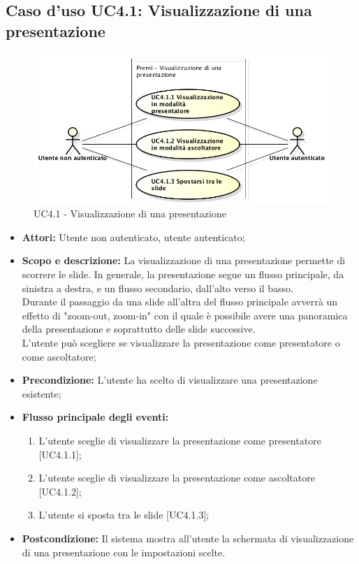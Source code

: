 \subsection{Caso d'uso UC4.1: Visualizzazione di una presentazione}
\begin{figure}[h] 
	\centering 
	\includegraphics[scale=0.45] {img/UC4.1.png}
	\caption{UC4.1 - Visualizzazione di una presentazione} 
\end{figure}

\begin{itemize}
	\item \textbf{Attori:} Utente non autenticato, utente autenticato;
	\item \textbf{Scopo e descrizione:} La visualizzazione di una presentazione permette di scorrere le slide. In generale, la presentazione segue un flusso principale, da sinistra a destra, e un flusso secondario, dall'alto verso il basso.\\
	Durante il passaggio da una slide all'altra del flusso principale avverrà un effetto di "zoom-out, zoom-in" con il quale è possibile avere una panoramica della presentazione e soprattutto delle \gls{slide} successive.\\
	L'utente può scegliere se visualizzare la presentazione come presentatore o come ascoltatore;
	\item \textbf{Precondizione:} L'utente ha scelto di visualizzare una presentazione esistente;
	\item \textbf{Flusso principale degli eventi:}
	\begin{enumerate}
		\item L'utente sceglie di visualizzare la presentazione come presentatore [UC4.1.1];
		\item L'utente sceglie di visualizzare la presentazione come ascoltatore [UC4.1.2];
		\item L'utente si sposta tra le slide [UC4.1.3];
	\end{enumerate}
	\item \textbf{Postcondizione:} Il sistema mostra all'utente la schermata di visualizzazione di una presentazione con le impostazioni scelte.
\end{itemize}

